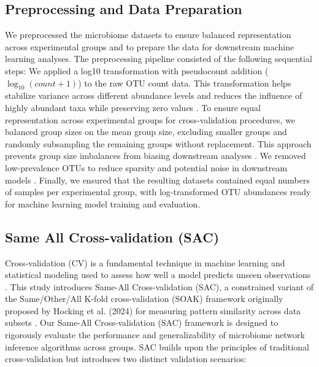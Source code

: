 \documentclass[]{Liebert_Author_revised}
\begin{document}
\subsection{Preprocessing and Data Preparation}
We preprocessed the microbiome datasets to ensure balanced representation across experimental groups and to prepare the data for downstream machine learning analyses.
The preprocessing pipeline consisted of the following sequential steps:
We applied a log10 transformation with pseudocount addition ($\log_{10}(count + 1)$) to the raw OTU count data.
This transformation helps stabilize variance across different abundance levels and reduces the influence of highly abundant taxa while preserving zero values \citep{agyapong2025cross, weiss2017normalization}.
To ensure equal representation across experimental groups for cross-validation procedures, we balanced group sizes on the mean group size, excluding smaller groups and randomly subsampling the remaining groups without replacement.
This approach prevents group size imbalances from biasing downstream analyses \citep{Knights2011supervised, pasolli2016machine}.
We removed low-prevalence OTUs to reduce sparsity and potential noise in downstream models \citep{papoutsoglou2023machine,Cao2021,Kurtz2015}.
Finally, we ensured that the resulting datasets contained equal numbers of samples per experimental group, with log-transformed OTU abundances ready for machine learning model training and evaluation.


\subsection{Same All Cross-validation (SAC)}
Cross-validation (CV) is a fundamental technique in machine learning and statistical modeling used to assess how well a model predicts unseen observations \citep{stone1974cv,agyapong2025cross}.
This study introduces Same-All Cross-validation (SAC), a constrained variant of the Same/Other/All K-fold cross-validation (SOAK) framework originally proposed by Hocking et al. (2024) for measuring pattern similarity across data subsets \citep{hocking2024soaksameotherallkfoldcrossvalidation}.
Our Same-All Cross-validation (SAC) framework is designed to rigorously evaluate the performance and generalizability of microbiome network inference algorithms across groups.
SAC builds upon the principles of traditional cross-validation but introduces two distinct validation scenarios:
\end{document}
